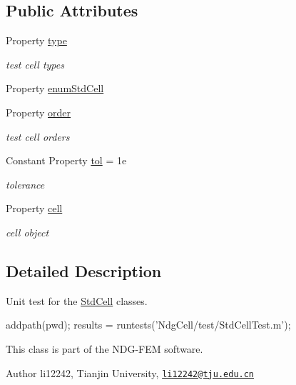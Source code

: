 \subsection*{Public Attributes}
\begin{DoxyCompactItemize}
\item 
Property \hyperlink{class_std_cell_test_a682c89deef81edd34d9e5fe7c84a022c}{type}
\begin{DoxyCompactList}\small\item\em test cell types \end{DoxyCompactList}\item 
Property \hyperlink{class_std_cell_test_a7fe3b32aabce6b77b16c3f505b98540a}{enum\+Std\+Cell}
\item 
Property \hyperlink{class_std_cell_test_a4f213b4195801baf37b26318f3aa3da1}{order}
\begin{DoxyCompactList}\small\item\em test cell orders \end{DoxyCompactList}\item 
Constant Property \hyperlink{class_std_cell_test_a18a2b19579642ba281c876be496bb1c3}{tol} = 1e
\begin{DoxyCompactList}\small\item\em tolerance \end{DoxyCompactList}\item 
Property \hyperlink{class_std_cell_test_a24b5d8a0c7f63a12a95c8896b5d1b6ed}{cell}
\begin{DoxyCompactList}\small\item\em cell object \end{DoxyCompactList}\end{DoxyCompactItemize}


\subsection{Detailed Description}
Unit test for the \hyperlink{class_std_cell}{Std\+Cell} classes. 


\begin{DoxyCode}
addpath(pwd);
results = runtests(\textcolor{stringliteral}{'NdgCell/test/StdCellTest.m'});
\end{DoxyCode}
 This class is part of the N\+D\+G-\/\+F\+EM software. \begin{DoxyAuthor}{Author}
li12242, Tianjin University, \href{mailto:li12242@tju.edu.cn}{\tt li12242@tju.\+edu.\+cn} 
\end{DoxyAuthor}


